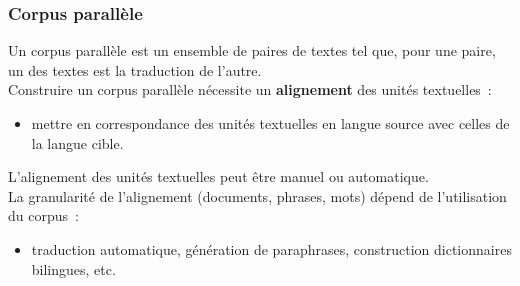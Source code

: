 \begin{frame}
\frametitle{Corpus parallèle}

Un corpus parallèle est un ensemble de paires de textes tel que, pour une 
paire, un des textes est la traduction de l'autre. \\[0.5em]

Construire un corpus parallèle nécessite un \textbf{alignement} des unités 
textuelles~:

    \begin{itemize}
        \item mettre en correspondance des unités textuelles en langue source
              avec celles de la langue cible.
    \end{itemize}

L'alignement des unités textuelles peut être manuel ou automatique.\\[0.5em]

La granularité de l'alignement (documents, phrases, mots) dépend de 
l'utilisation du corpus~:

    \begin{itemize}
        \item traduction automatique, génération de paraphrases, construction
              dictionnaires bilingues, etc.
    \end{itemize}

\end{frame}

